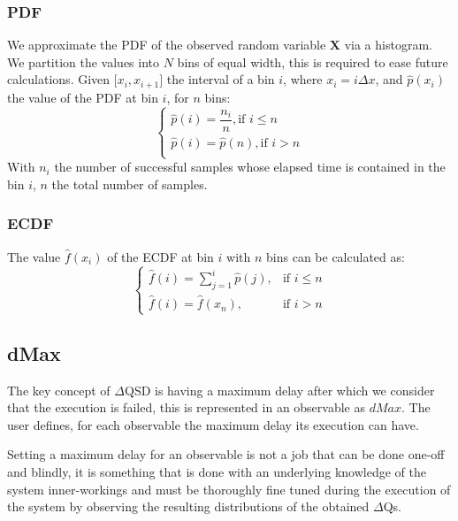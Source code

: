     \subsubsection{PDF}
  We approximate the PDF of the observed random variable $\textbf{X}$ via a histogram. We partition the values into $N$ bins of equal width, this is required to ease future calculations.
        Given $\lbrack x_i, x_{i+1} \rbrack$ the interval of a bin $i$, where $x_i = i\Delta x$, and $\hat{p}(x_i)$ the value of the PDF at bin $i$, for $n$ bins:
        \begin{equation}
            \begin{cases}
                \hat{p}(i) = \dfrac{n_i}{n}, \text{if } i \le n \\
                \hat{p}(i) = \hat{p}(n), \text{if } i > n \\
            \end{cases}
            \label{eq:pdf}
        \end{equation}
   With $n_i$ the number of successful samples whose elapsed time is contained in the bin $i$, $n$ the total number of samples.
    \subsubsection{ECDF}
    The value $\hat{f}(x_i)$ of the ECDF at bin $i$ with $n$ bins can be calculated as:
    \begin{equation}
        \begin{cases}
            \hat{f}(i) = \sum_{j=1}^{i} \hat{p}(j), & \text{if } i \le n \\  
            \hat{f}(i) = \hat{f}(x_n), & \text{if } i > n 
        \end{cases}
        \label{eq:cdf}
    \end{equation}
    
    \subsection{dMax}
        The key concept of $\Delta$QSD is having a maximum delay after which we consider that the execution is failed, this is represented in an observable as $dMax$. The user defines, for each observable the maximum delay its execution can have.

Setting a maximum delay for an observable is not a job that can be done one-off and blindly, it is something that is done with an underlying knowledge of the system inner-workings and must be thoroughly fine tuned during the execution of the system by observing the resulting distributions of the obtained $\Delta$Qs. 

